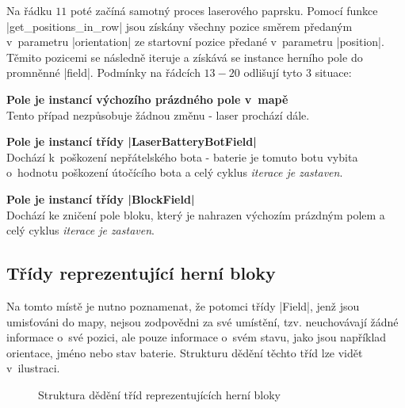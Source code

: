{\begin{figure}[!h]
\end{figure}

\begin{sloppypar}
    Na řádku $11$ poté začíná samotný proces laserového paprsku. Pomocí funkce \ic|get_positions_in_row| jsou získány všechny pozice směrem předaným v~parametru \ic|orientation| ze startovní pozice předané v~parametru \ic|position|. Těmito pozicemi se následně iteruje a získává se instance herního pole do promněnné \ic|field|. Podmínky na řádcích $13-20$ odlišují tyto 3 situace:
\end{sloppypar}

\begin{description}
    \item {\bfseries Pole je instancí výchozího prázdného pole v~mapě} \\
        Tento případ nezpůsobuje žádnou změnu - laser prochází dále.

    \item {\bfseries Pole je instancí třídy \ic|LaserBatteryBotField|} \\
        Dochází k~poškození nepřátelského bota - baterie je tomuto botu vybita o~hodnotu poškození útočícího bota a celý cyklus \emph{iterace je zastaven}.

    \item {\bfseries Pole je instancí třídy \ic|BlockField|} \\
        Dochází ke zničení pole bloku, který je nahrazen výchozím prázdným polem a celý cyklus \emph{iterace je zastaven}.
\end{description}
} %

\subsection{Třídy reprezentující herní bloky}

Na tomto místě je nutno poznamenat, že potomci třídy \ic|Field|, jenž jsou umisťováni do mapy, nejsou zodpovědni za své umístění, tzv. neuchovávají žádné informace o~své pozici, ale pouze informace o~svém stavu, jako jsou například orientace, jméno nebo stav baterie. Strukturu dědění těchto tříd lze vidět v~ilustraci.

\begin{figure}[h]
    \centering
    
    \caption{Struktura dědění tříd reprezentujících herní bloky}
    \label{fig:fields-uml}
\end{figure}

